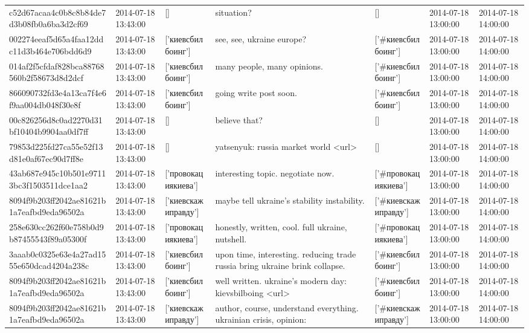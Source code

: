 \begin{tabular}{lllllll}
c52d67acaa4c0b8c8b84de7d3b08fb0a6ba3d2cf69 & 2014-07-18 13:43:00 & [] & situation? & [] & 2014-07-18 13:00:00 & 2014-07-18 14:00:00 \\
002274eeaf5d65a4faa12ddc11d3b464e706bdd6d9 & 2014-07-18 13:43:00 & ['киевсбилбоинг'] & see, see, ukraine europe? & ['#киевсбилбоинг'] & 2014-07-18 13:00:00 & 2014-07-18 14:00:00 \\
014af2f5cfdaf828bca88768560b2f58673d8d2dcf & 2014-07-18 13:43:00 & ['киевсбилбоинг'] & many people, many opinions. & ['#киевсбилбоинг'] & 2014-07-18 13:00:00 & 2014-07-18 14:00:00 \\
866090732fd3e4a13ca7f4e6f9aa004db048f30e8f & 2014-07-18 13:43:00 & ['киевсбилбоинг'] & going write post soon. & ['#киевсбилбоинг'] & 2014-07-18 13:00:00 & 2014-07-18 14:00:00 \\
00c826256d8c0ad2270d31bf10404b9904aa0df7ff & 2014-07-18 13:43:00 & [] & believe that? & [] & 2014-07-18 13:00:00 & 2014-07-18 14:00:00 \\
79853d225fd27ca55e52f13d81e0af67ec90d7ff8e & 2014-07-18 13:43:00 & [] & yatsenyuk: russia market world <url> & [] & 2014-07-18 13:00:00 & 2014-07-18 14:00:00 \\
43ab687e945c10b501e97113bc3f1503511dce1aa2 & 2014-07-18 13:43:00 & ['провокациякиева'] & interesting topic. negotiate now. & ['#провокациякиева'] & 2014-07-18 13:00:00 & 2014-07-18 14:00:00 \\
8094f9b203ff2042ae81621b1a7eafbd9eda96502a & 2014-07-18 13:43:00 & ['киевскажиправду'] & maybe tell ukraine's stability instability. & ['#киевскажиправду'] & 2014-07-18 13:00:00 & 2014-07-18 14:00:00 \\
258e630cc262f60e758b0d9b87455543f89a05300f & 2014-07-18 13:43:00 & ['провокациякиева'] & honestly, written, cool. full ukraine, nutshell. & ['#провокациякиева'] & 2014-07-18 13:00:00 & 2014-07-18 14:00:00 \\
3aaab0c0325e63e4a27ad1555e650dcad4204a238c & 2014-07-18 13:43:00 & ['киевсбилбоинг'] & upon time, interesting. reducing trade russia bring ukraine brink collapse. & ['#киевсбилбоинг'] & 2014-07-18 13:00:00 & 2014-07-18 14:00:00 \\
8094f9b203ff2042ae81621b1a7eafbd9eda96502a & 2014-07-18 13:43:00 & ['киевсбилбоинг'] & well written. ukraine's modern day: kievsbilboing <url> & ['#киевсбилбоинг'] & 2014-07-18 13:00:00 & 2014-07-18 14:00:00 \\
8094f9b203ff2042ae81621b1a7eafbd9eda96502a & 2014-07-18 13:43:00 & ['киевскажиправду'] & author, course, understand everything. ukrainian crisis, opinion: & ['#киевскажиправду'] & 2014-07-18 13:00:00 & 2014-07-18 14:00:00 \\

\end{tabular}
